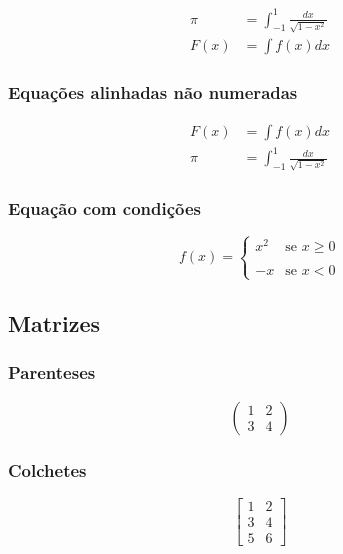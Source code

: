 \documentclass[twoside]{article}
\begin{document}
	\begin{align}
		\pi &= \int_{-1}^{1} \frac{dx}{\sqrt{1-x^2}}	\label{eq:pi} \\
		F(x) &= \int f(x) dx
		\label{eq:int}
	\end{align}

	\subsubsection{Equações alinhadas não numeradas}
	
	\begin{align*}
		F(x) &= \int f(x) dx \\
		\pi &= \int_{-1}^{1} \frac{dx}{\sqrt{1-x^2}}
	\end{align*}

	\subsubsection{Equação com condições}

	\begin{equation*}
	f(x) = 
		\begin{cases}
			x^2 & \text{se } x \geq 0 \\\\
			-x & \text{se } x < 0
		\end{cases}
	\end{equation*}

	\subsection{Matrizes}
	
	\subsubsection{Parenteses}
	
	\begin{equation*}
		\begin{pmatrix}
		1 & 2 \\
		3 & 4
		\end{pmatrix}
	\end{equation*}
	
	\subsubsection{Colchetes}
	
	\begin{equation*}
		\begin{bmatrix}
			1 & 2 \\
			3 & 4 \\
			5 & 6
		\end{bmatrix}
	\end{equation*}
	
\end{document}
